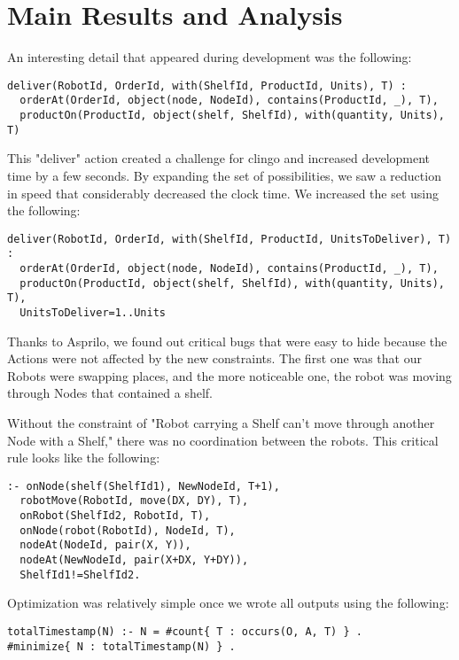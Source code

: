 \documentclass[letterpaper]{article} %
\begin{document}
\section{Main Results and Analysis}

An interesting detail that appeared during development was the following:

\begin{lstlisting}[numbers=none,language=clingo]
deliver(RobotId, OrderId, with(ShelfId, ProductId, Units), T) : 
  orderAt(OrderId, object(node, NodeId), contains(ProductId, _), T),
  productOn(ProductId, object(shelf, ShelfId), with(quantity, Units), T)
\end{lstlisting}

This "deliver" action created a challenge for clingo and increased development time by a few seconds. By expanding the set of possibilities, we saw a reduction in speed that considerably decreased the clock time. We increased the set using the following:

\begin{lstlisting}[numbers=none,language=clingo]
deliver(RobotId, OrderId, with(ShelfId, ProductId, UnitsToDeliver), T) : 
  orderAt(OrderId, object(node, NodeId), contains(ProductId, _), T),
  productOn(ProductId, object(shelf, ShelfId), with(quantity, Units), T), 
  UnitsToDeliver=1..Units
\end{lstlisting}

Thanks to Asprilo, we found out critical bugs that were easy to hide because the Actions were not affected by the new constraints. The first one was that our Robots were swapping places, and the more noticeable one, the robot was moving through Nodes that contained a shelf. 

Without the constraint of "Robot carrying a Shelf can't move through another Node with a Shelf," there was no coordination between the robots. This critical rule looks like the following:

\begin{lstlisting}[numbers=none,language=clingo]
:- onNode(shelf(ShelfId1), NewNodeId, T+1),
  robotMove(RobotId, move(DX, DY), T),
  onRobot(ShelfId2, RobotId, T),
  onNode(robot(RobotId), NodeId, T),
  nodeAt(NodeId, pair(X, Y)),
  nodeAt(NewNodeId, pair(X+DX, Y+DY)),
  ShelfId1!=ShelfId2.
\end{lstlisting}


Optimization was relatively simple once we wrote all outputs using the following:

\begin{lstlisting}[numbers=none,language=clingo]
totalTimestamp(N) :- N = #count{ T : occurs(O, A, T) } .
#minimize{ N : totalTimestamp(N) } .
\end{lstlisting}
\end{document}
